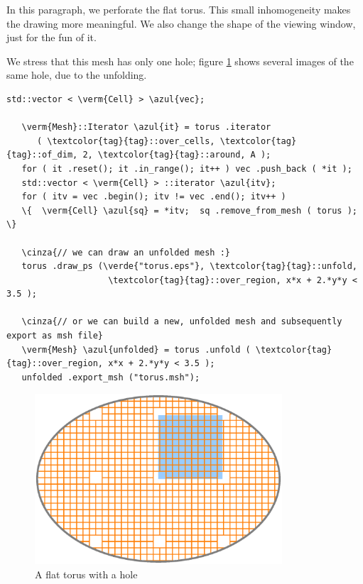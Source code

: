 In this paragraph, we perforate the flat torus.
This small inhomogeneity makes the drawing more meaningful.
We also change the shape of the viewing window, just for the fun of it.

We stress that this mesh has only one hole; figure \ref{\numb section 7.\numb fig 2}
shows several images of the same hole, due to the unfolding.

\begin{Verbatim}[commandchars=\\\{\},formatcom=\small\tt,frame=single,
   label=parag-\ref{\numb section 7.\numb parag 6}.cpp,rulecolor=\color{coment},
   baselinestretch=0.94,framesep=2mm                                            ]
   std::vector < \verm{Cell} > \azul{vec};

   \verm{Mesh}::Iterator \azul{it} = torus .iterator
      ( \textcolor{tag}{tag}::over_cells, \textcolor{tag}{tag}::of_dim, 2, \textcolor{tag}{tag}::around, A );
   for ( it .reset(); it .in_range(); it++ ) vec .push_back ( *it );
   std::vector < \verm{Cell} > ::iterator \azul{itv};
   for ( itv = vec .begin(); itv != vec .end(); itv++ )
   \{  \verm{Cell} \azul{sq} = *itv;  sq .remove_from_mesh ( torus );  \}

   \cinza{// we can draw an unfolded mesh :}
   torus .draw_ps (\verde{"torus.eps"}, \textcolor{tag}{tag}::unfold,
                    \textcolor{tag}{tag}::over_region, x*x + 2.*y*y < 3.5 );

   \cinza{// or we can build a new, unfolded mesh and subsequently export as msh file}
   \verm{Mesh} \azul{unfolded} = torus .unfold ( \textcolor{tag}{tag}::over_region, x*x + 2.*y*y < 3.5 );
   unfolded .export_msh ("torus.msh");
\end{Verbatim}

\begin{figure}[ht] \centering
  \includegraphics[width=92mm]{flat-torus-2.eps}
  \caption{A flat torus with a hole}
  \label{\numb section 7.\numb fig 2}
\end{figure}

